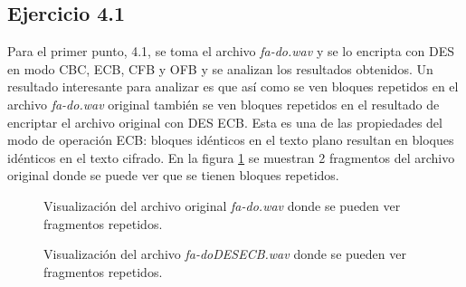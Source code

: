 \documentclass[a4paper,10pt]{article}
\begin{document}
\subsection{Ejercicio 4.1}
Para el primer punto, 4.1, se toma el archivo \emph{fa-do.wav} y se lo encripta
con DES en modo CBC, ECB, CFB y OFB y se analizan los resultados obtenidos.
Un resultado interesante para analizar es que as\'i como se ven bloques repetidos
en el archivo \emph{fa-do.wav} original tambi\'en se ven bloques repetidos en el 
resultado de encriptar el archivo original con DES ECB. Esta es una de las propiedades
del modo de operaci\'on ECB: bloques id\'enticos en el texto plano resultan en 
bloques id\'enticos en el texto cifrado. En la figura \ref{fig:41Original} se
muestran 2 fragmentos del archivo original donde se puede ver que se tienen bloques
repetidos. 
\begin{figure}
	\begin{center}
	\end{center}
	\caption{Visualización del archivo original \emph{fa-do.wav} donde se pueden ver
		fragmentos repetidos.}
	\label{fig:41Original}
\end{figure}
\begin{figure}
	\begin{center}
	\end{center}
	\caption{Visualización del archivo \emph{fa-doDESECB.wav} donde se pueden ver
		fragmentos repetidos.}
	\label{fig:41ECB}
\end{figure}
\end{document}
